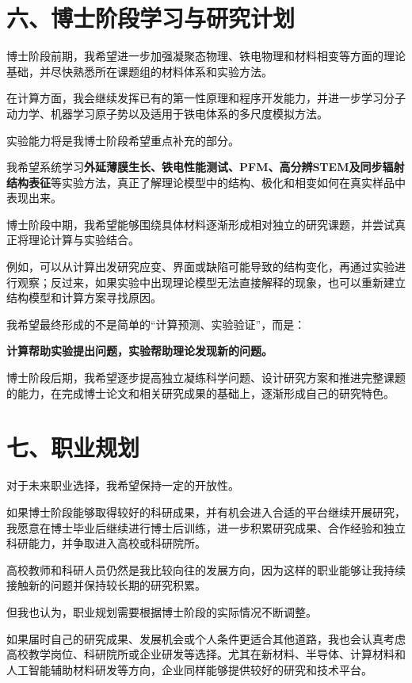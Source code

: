 \section{六、博士阶段学习与研究计划}

博士阶段前期，我希望进一步加强凝聚态物理、铁电物理和材料相变等方面的理论基础，并尽快熟悉所在课题组的材料体系和实验方法。

在计算方面，我会继续发挥已有的第一性原理和程序开发能力，并进一步学习分子动力学、机器学习原子势以及适用于铁电体系的多尺度模拟方法。

实验能力将是我博士阶段希望重点补充的部分。

我希望系统学习\textbf{外延薄膜生长、铁电性能测试、PFM、高分辨STEM及同步辐射结构表征}等实验方法，真正了解理论模型中的结构、极化和相变如何在真实样品中表现出来。

博士阶段中期，我希望能够围绕具体材料逐渐形成相对独立的研究课题，并尝试真正将理论计算与实验结合。

例如，可以从计算出发研究应变、界面或缺陷可能导致的结构变化，再通过实验进行观察；反过来，如果实验中出现理论模型无法直接解释的现象，也可以重新建立结构模型和计算方案寻找原因。

我希望最终形成的不是简单的“计算预测、实验验证”，而是：

\textbf{计算帮助实验提出问题，实验帮助理论发现新的问题。}

博士阶段后期，我希望逐步提高独立凝练科学问题、设计研究方案和推进完整课题的能力，在完成博士论文和相关研究成果的基础上，逐渐形成自己的研究特色。

\section{七、职业规划}

对于未来职业选择，我希望保持一定的开放性。

如果博士阶段能够取得较好的科研成果，并有机会进入合适的平台继续开展研究，我愿意在博士毕业后继续进行博士后训练，进一步积累研究成果、合作经验和独立科研能力，并争取进入高校或科研院所。

高校教师和科研人员仍然是我比较向往的发展方向，因为这样的职业能够让我持续接触新的问题并保持较长期的研究积累。

但我也认为，职业规划需要根据博士阶段的实际情况不断调整。

如果届时自己的研究成果、发展机会或个人条件更适合其他道路，我也会认真考虑高校教学岗位、科研院所或企业研发等选择。尤其在新材料、半导体、计算材料和人工智能辅助材料研发等方向，企业同样能够提供较好的研究和技术平台。


